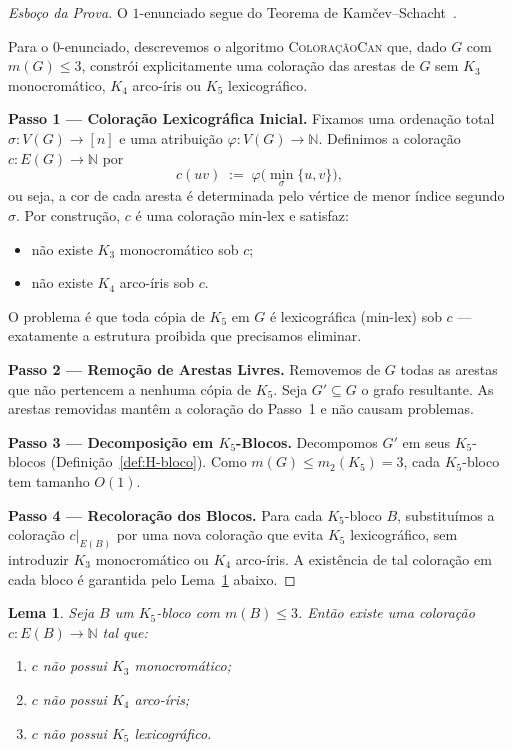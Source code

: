 \documentclass[reqno, 12pt]{amsart}
\numberwithin{equation}{section}
\theoremstyle{plain}
\newtheorem{lemma}[theorem]{Lema}
\theoremstyle{definition}
\newcommand{\mdens}{m_2}
\newcommand{\maxdens}{m}
\begin{document}
\begin{proof}[Esbo\c{c}o da Prova]
  O $1$-enunciado segue do Teorema de Kam\v{c}ev--Schacht~\cite{kamcev2023canonical}.

  Para o $0$-enunciado, descrevemos o algoritmo \textsc{Colora\c{c}\~{a}oCan} que, dado $G$ com $\maxdens(G) \le 3$, constr\'{o}i explicitamente uma colora\c{c}\~{a}o das arestas de $G$ sem $K_3$ monocrom\'{a}tico, $K_4$ arco-\'{i}ris ou $K_5$ lexicogr\'{a}fico.

  \textbf{Passo 1 --- Colora\c{c}\~{a}o Lexicogr\'{a}fica Inicial.}
  Fixamos uma ordena\c{c}\~{a}o total $\sigma: V(G) \to [n]$ e uma atribui\c{c}\~{a}o $\varphi: V(G) \to \mathbb{N}$.
  Definimos a colora\c{c}\~{a}o $c: E(G) \to \mathbb{N}$ por
  \[ c(uv) \;:=\; \varphi\!\bigl(\min_\sigma\{u,v\}\bigr), \]
  ou seja, a cor de cada aresta \'{e} determinada pelo v\'{e}rtice de menor \'{i}ndice segundo $\sigma$.
  Por constru\c{c}\~{a}o, $c$ \'{e} uma colora\c{c}\~{a}o min-lex e satisfaz:
  \begin{itemize}
    \item n\~{a}o existe $K_3$ monocrom\'{a}tico sob $c$;
    \item n\~{a}o existe $K_4$ arco-\'{i}ris sob $c$.
  \end{itemize}
  O problema \'{e} que toda c\'{o}pia de $K_5$ em $G$ \'{e} lexicogr\'{a}fica (min-lex) sob $c$ --- exatamente a estrutura proibida que precisamos eliminar.

  \textbf{Passo 2 --- Remo\c{c}\~{a}o de Arestas Livres.}
  Removemos de $G$ todas as arestas que n\~{a}o pertencem a nenhuma c\'{o}pia de $K_5$.
  Seja $G' \subseteq G$ o grafo resultante. As arestas removidas mant\^{e}m a colora\c{c}\~{a}o do Passo~1 e n\~{a}o causam problemas.

  \textbf{Passo 3 --- Decomposi\c{c}\~{a}o em $K_5$-Blocos.}
  Decompomos $G'$ em seus $K_5$-blocos (Defini\c{c}\~{a}o~\ref{def:H-bloco}).
  Como $\maxdens(G) \le \mdens(K_5) = 3$, cada $K_5$-bloco tem tamanho $O(1)$.

  \textbf{Passo 4 --- Recolora\c{c}\~{a}o dos Blocos.}
  Para cada $K_5$-bloco $B$, substitu\'{i}mos a colora\c{c}\~{a}o $c|_{E(B)}$ por uma nova colora\c{c}\~{a}o que evita $K_5$ lexicogr\'{a}fico, sem introduzir $K_3$ monocrom\'{a}tico ou $K_4$ arco-\'{i}ris.
  A exist\^{e}ncia de tal colora\c{c}\~{a}o em cada bloco \'{e} garantida pelo Lema~\ref{lem:0-statement-K5} abaixo.
\end{proof}

\begin{lemma}
  \label{lem:0-statement-K5}
  Seja $B$ um $K_5$-bloco com $\maxdens(B) \le 3$. Ent\~{a}o existe uma colora\c{c}\~{a}o $c: E(B) \to \mathbb{N}$ tal que:
  \begin{enumerate}
    \item[(i)] $c$ n\~{a}o possui $K_3$ monocrom\'{a}tico;
    \item[(ii)] $c$ n\~{a}o possui $K_4$ arco-\'{i}ris;
    \item[(iii)] $c$ n\~{a}o possui $K_5$ lexicogr\'{a}fico.
  \end{enumerate}
\end{lemma}
\end{document}
